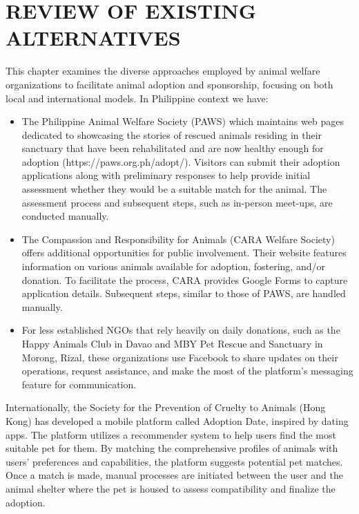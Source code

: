 \section{REVIEW OF EXISTING ALTERNATIVES}
This chapter examines the diverse approaches employed by animal welfare organizations to facilitate animal adoption and sponsorship, focusing on both local and international models. In Philippine context we have:

\begin{itemize}
 \item The Philippine Animal Welfare Society (PAWS) which maintains web pages dedicated to showcasing the stories of rescued animals residing in their sanctuary that have been rehabilitated and are now healthy enough for adoption (https://paws.org.ph/adopt/). Visitors can submit their adoption applications along with preliminary responses to help provide initial assessment whether they would be a suitable match for the animal. The assessment process and subsequent steps, such as in-person meet-ups, are conducted manually.

  \item The Compassion and Responsibility for Animals (CARA Welfare Society) offers additional opportunities for public involvement. Their website features information on various animals available for adoption, fostering, and/or donation. To facilitate the process, CARA provides Google Forms to capture application details. Subsequent steps, similar to those of PAWS, are handled manually.

 \item For less established NGOs that rely heavily on daily donations, such as the Happy Animals Club in Davao and MBY Pet Rescue and Sanctuary in Morong, Rizal, these organizations use Facebook to share updates on their operations, request assistance, and make the most of the platform's messaging feature for communication.
 \end{itemize}

Internationally, the Society for the Prevention of Cruelty to Animals (Hong Kong) has developed a mobile platform called Adoption Date, inspired by dating apps. The platform utilizes a recommender system to help users find the most suitable pet for them. By matching the comprehensive profiles of animals with users' preferences and capabilities, the platform suggests potential pet matches. Once a match is made, manual processes are initiated between the user and the animal shelter where the pet is housed to assess compatibility and finalize the adoption.

                
